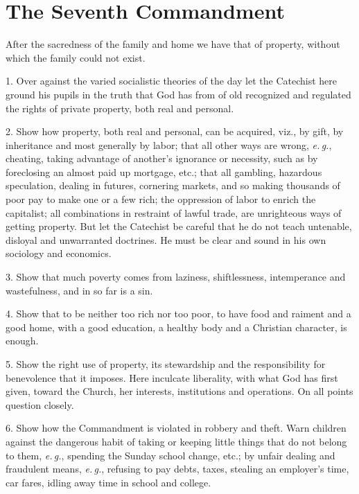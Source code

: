 \section{The Seventh Commandment}

After the sacredness of the family and home we have that of property, without which the family could not exist.

1. Over against the varied socialistic theories of the day let the Catechist here ground his pupils in the truth that God has from of old recognized and regulated the rights of private property, both real and personal.

 2. Show how property, both real and personal, can be acquired, viz., by gift, by inheritance and most generally by labor; that all other ways are wrong, \emph{e.\,g.}, cheating, taking advantage of another’s ignorance or necessity, such as by foreclosing an almost paid up mortgage, etc.; that all gambling, hazardous speculation, dealing in futures, cornering markets, and so making thousands of poor pay to make one or a few rich; the oppression of labor to enrich the capitalist; all combinations in restraint of lawful trade, are unrighteous ways of getting property. But let the Catechist be careful that he do not teach untenable, disloyal and unwarranted doctrines. He must be clear and sound in his own sociology and economics.

3. Show that much poverty comes from laziness, shiftlessness, intemperance and wastefulness, and in so far is a sin.

 4. Show that to be neither too rich nor too poor, to have food and raiment and a good home, with a good education, a healthy body and a Christian character, is enough.

5. Show the right use of property, its stewardship
and the responsibility for benevolence that it imposes. Here inculcate liberality, with what God has first given, toward the Church, her interests, institutions and operations. On all points question closely.

 6. Show how the Commandment is violated in robbery and theft. Warn children against the dangerous habit of taking or keeping little things that do not belong to them, \emph{e.\,g.}, spending the Sunday school change, etc.; by unfair dealing and fraudulent means, \emph{e.\,g.}, refusing to pay debts, taxes, stealing an employer’s time, car fares, idling away time in school and college.

